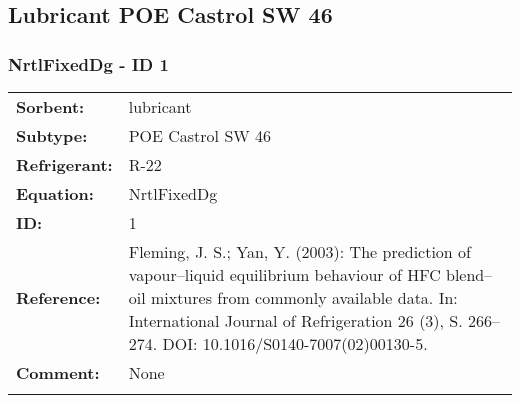 \subsection{Lubricant POE Castrol SW 46}
%
\subsubsection{NrtlFixedDg - ID 1}
%
\begin{tabular}[l]{|lp{11.5cm}|}
\hline
\addlinespace

\textbf{Sorbent:} & lubricant \\
\textbf{Subtype:} & POE Castrol SW 46 \\
\textbf{Refrigerant:} & R-22 \\
\textbf{Equation:} & NrtlFixedDg \\
\textbf{ID:} & 1 \\
\textbf{Reference:} & Fleming, J. S.; Yan, Y. (2003): The prediction of vapour–liquid equilibrium behaviour of HFC blend–oil mixtures from commonly available data. In: International Journal of Refrigeration 26 (3), S. 266–274. DOI: 10.1016/S0140-7007(02)00130-5. \\
\textbf{Comment:} & None \\

\addlinespace
\hline
\end{tabular}
\newline

